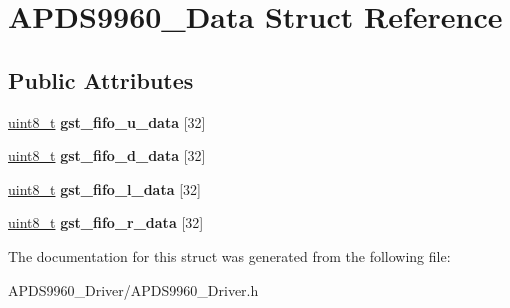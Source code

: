 \hypertarget{structAPDS9960__Data}{}\section{A\+P\+D\+S9960\+\_\+\+Data Struct Reference}
\label{structAPDS9960__Data}
\subsection*{Public Attributes}
\begin{DoxyCompactItemize}
\item 
\mbox{\label{structAPDS9960__Data_a21b21a862b3d40242eeb5b5e3ea54a3c}} 
\hyperlink{vl53l0x__types_8h_aba7bc1797add20fe3efdf37ced1182c5}{uint8\+\_\+t} {\bfseries gst\+\_\+fifo\+\_\+u\+\_\+data} \mbox{[}32\mbox{]}
\item 
\mbox{\label{structAPDS9960__Data_a041e9de3ebfaaaef4352014bff658961}} 
\hyperlink{vl53l0x__types_8h_aba7bc1797add20fe3efdf37ced1182c5}{uint8\+\_\+t} {\bfseries gst\+\_\+fifo\+\_\+d\+\_\+data} \mbox{[}32\mbox{]}
\item 
\mbox{\label{structAPDS9960__Data_a94000155a049b0e5e8736706685d7397}} 
\hyperlink{vl53l0x__types_8h_aba7bc1797add20fe3efdf37ced1182c5}{uint8\+\_\+t} {\bfseries gst\+\_\+fifo\+\_\+l\+\_\+data} \mbox{[}32\mbox{]}
\item 
\mbox{\label{structAPDS9960__Data_af1841e6cce95aa70b12908546b79774f}} 
\hyperlink{vl53l0x__types_8h_aba7bc1797add20fe3efdf37ced1182c5}{uint8\+\_\+t} {\bfseries gst\+\_\+fifo\+\_\+r\+\_\+data} \mbox{[}32\mbox{]}
\end{DoxyCompactItemize}


The documentation for this struct was generated from the following file\+:\begin{DoxyCompactItemize}
\item 
A\+P\+D\+S9960\+\_\+\+Driver/A\+P\+D\+S9960\+\_\+\+Driver.\+h\end{DoxyCompactItemize}
